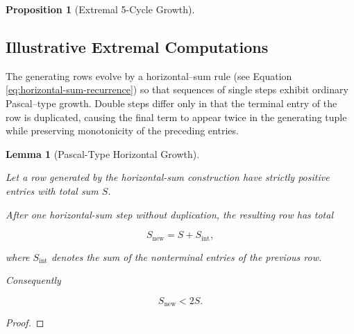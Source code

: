 \documentclass[12pt, oneside]{article}
\numberwithin{equation}{section}
\theoremstyle{definition}
\newtheorem{proposition}{Proposition}[section]
\theoremstyle{plain}
\newtheorem{lemma}[theorem]{Lemma}
\theoremstyle{remark}
\begin{document}
\begin{proposition}[Extremal 5-Cycle Growth]



\subsection{Illustrative Extremal Computations}

The generating rows evolve by a horizontal--sum rule (see Equation \ref{eq:horizontal-sum-recurrence})
so that sequences of single steps exhibit ordinary Pascal--type growth.
Double steps differ only in that the terminal entry of the row is duplicated,
causing the final term to appear twice in the generating tuple while preserving
monotonicity of the preceding entries.


\begin{lemma}[Pascal-Type Horizontal Growth]
\label{lem:pascal-growth}

Let a row generated by the horizontal-sum construction have strictly positive entries
with total sum $S$.

After one horizontal-sum step without duplication, the resulting row has total

\[
S_{\mathrm{new}}
=
S+S_{\mathrm{int}},
\]

where $S_{\mathrm{int}}$ denotes the sum of the nonterminal entries of the
previous row.

Consequently

\[
S_{\mathrm{new}} < 2S.
\]

\end{lemma}

\begin{proof}


\end{proof}
\end{proposition}
\end{document}
